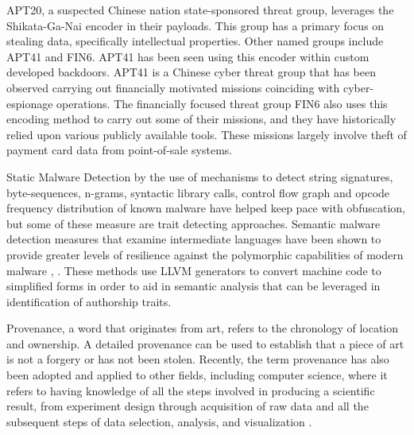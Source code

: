 \documentclass[12pt]{report}
\begin{document}
APT20, a suspected Chinese nation state-sponsored threat group, leverages the Shikata-Ga-Nai encoder in their payloads.  This group has a primary focus on stealing data, specifically intellectual properties.  Other named groups include APT41 and FIN6.  APT41 has been seen using this encoder within custom developed backdoors.  APT41 is a Chinese cyber threat group that has been observed carrying out financially motivated missions coinciding with cyber-espionage operations.  The financially focused threat group FIN6 also uses this encoding method to carry out some of their missions, and they have historically relied upon various publicly available tools. These missions largely involve theft of payment card data from point-of-sale systems. 

Static Malware Detection by the use of mechanisms to detect string signatures, byte-sequences, n-grams, syntactic library calls, control flow graph and opcode frequency distribution of known malware have helped keep pace with obfuscation, but some of these measure are trait detecting approaches.  Semantic malware detection measures that examine intermediate languages have been shown to provide greater levels of resilience against the polymorphic capabilities of modern malware \cite{christodorescu2005semantics}, \cite{ranjan2016boolean}.  These methods use LLVM generators to convert machine code to simplified forms in order to aid in semantic analysis that can be leveraged in identification of authorship traits.  

Provenance, a word that originates from art, refers to the chronology of location and ownership.  A detailed provenance can be used to establish that a piece of art is not a forgery or has not been stolen.  Recently, the term provenance has also been adopted and applied to other fields, including computer science, where it refers to having knowledge of all the steps involved in producing a scientific result, from experiment design through acquisition of raw data and all the subsequent steps of data selection, analysis, and visualization \cite{provenance:2011}.
\end{document}
